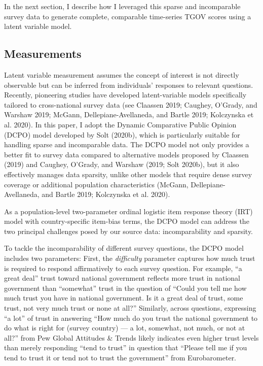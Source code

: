 \documentclass[
  12pt,
]{article}
\begin{document}
In the next section, I describe how I leveraged this sparse and incomparable survey data to generate complete, comparable time-series TGOV scores using a latent variable model.

\subsection{Measurements}\label{measurements}

Latent variable measurement assumes the concept of interest is not directly observable but can be inferred from individuals' responses to relevant questions.
Recently, pioneering studies have developed latent-variable models specifically tailored to cross-national survey data (see Claassen 2019; Caughey, O'Grady, and Warshaw 2019; McGann, Dellepiane-Avellaneda, and Bartle 2019; Kolczynska et al. 2020).
In this paper, I adopt the Dynamic Comparative Public Opinion (DCPO) model developed by Solt (2020b), which is particularly suitable for handling sparse and incomparable data.
The DCPO model not only provides a better fit to survey data compared to alternative models proposed by Claassen (2019) and Caughey, O'Grady, and Warshaw (2019; Solt 2020b), but it also effectively manages data sparsity, unlike other models that require dense survey coverage or additional population characteristics (McGann, Dellepiane-Avellaneda, and Bartle 2019; Kolczynska et al. 2020).

As a population-level two-parameter ordinal logistic item response theory (IRT) model with country-specific item-bias terms, the DCPO model can address the two principal challenges posed by our source data: incomparability and sparsity.

To tackle the incomparability of different survey questions, the DCPO model includes two parameters:
First, the \emph{difficulty} parameter captures how much trust is required to respond affirmatively to each survey question.
For example, ``a great deal'' trust toward national government reflects more trust in national government than ``somewhat'' trust in the question of ``Could you tell me how much trust you have in national government. Is it a great deal of trust, some trust, not very much trust or none at all?''
Similarly, across questions, expressing ``a lot'' of trust in answering ``How much do you trust the national government to do what is right for (survey country) --- a lot, somewhat, not much, or not at all?'' from Pew Global Attitudes \& Trends likely indicates even higher trust levels than merely responding ``tend to trust'' in question that ``Please tell me if you tend to trust it or tend not to trust the government'' from Eurobarometer.
\end{document}
